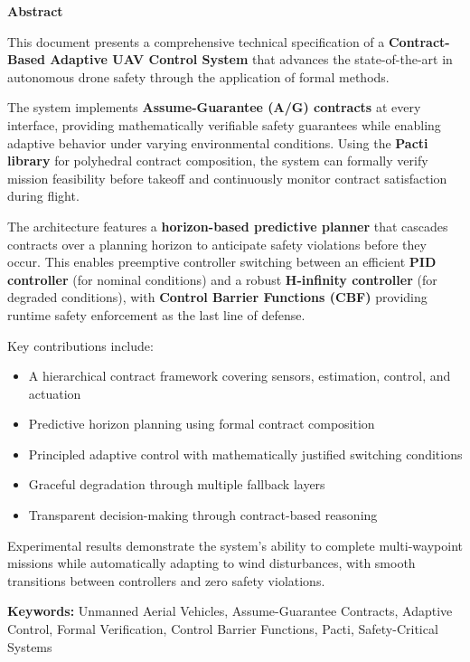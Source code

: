 \thispagestyle{empty}
\begin{center}
    {\Large\bfseries Abstract}
\end{center}

\vspace{0.5cm}

\noindent
This document presents a comprehensive technical specification of a \textbf{Contract-Based Adaptive UAV Control System} that advances the state-of-the-art in autonomous drone safety through the application of formal methods.

The system implements \textbf{Assume-Guarantee (A/G) contracts} at every interface, providing mathematically verifiable safety guarantees while enabling adaptive behavior under varying environmental conditions. Using the \textbf{Pacti library} for polyhedral contract composition, the system can formally verify mission feasibility before takeoff and continuously monitor contract satisfaction during flight.

The architecture features a \textbf{horizon-based predictive planner} that cascades contracts over a planning horizon to anticipate safety violations before they occur. This enables preemptive controller switching between an efficient \textbf{PID controller} (for nominal conditions) and a robust \textbf{H-infinity controller} (for degraded conditions), with \textbf{Control Barrier Functions (CBF)} providing runtime safety enforcement as the last line of defense.

Key contributions include:
\begin{itemize}[leftmargin=*,itemsep=3pt]
    \item A hierarchical contract framework covering sensors, estimation, control, and actuation
    \item Predictive horizon planning using formal contract composition
    \item Principled adaptive control with mathematically justified switching conditions
    \item Graceful degradation through multiple fallback layers
    \item Transparent decision-making through contract-based reasoning
\end{itemize}

Experimental results demonstrate the system's ability to complete multi-waypoint missions while automatically adapting to wind disturbances, with smooth transitions between controllers and zero safety violations.

\vspace{1cm}

\noindent\textbf{Keywords:} Unmanned Aerial Vehicles, Assume-Guarantee Contracts, Adaptive Control, Formal Verification, Control Barrier Functions, Pacti, Safety-Critical Systems

\newpage
